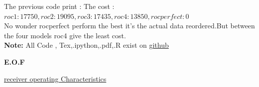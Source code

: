 \documentclass{article}
\begin{document}
The previous code print :
The cost :\( roc1:17750, roc2:19095, roc3:17435, roc4:13850, rocperfect:0\) \\ No wonder rocperfect perform the best it's the actual data reordered.But between the four models roc4 give the least cost.\\
\textbf{Note:} All Code , Tex,.ipython,.pdf,.R exist on \href{https://github.com/aqeel13932/DM/tree/master/HW09}{github}
\begin{center}
\textbf{E.O.F}
\end{center}
\begin{thebibliography}{9}
	\href{https://en.wikipedia.org/wiki/Receiver_operating_characteristic}{receiver operating Characteristics }
\end{thebibliography}
\end{document}
